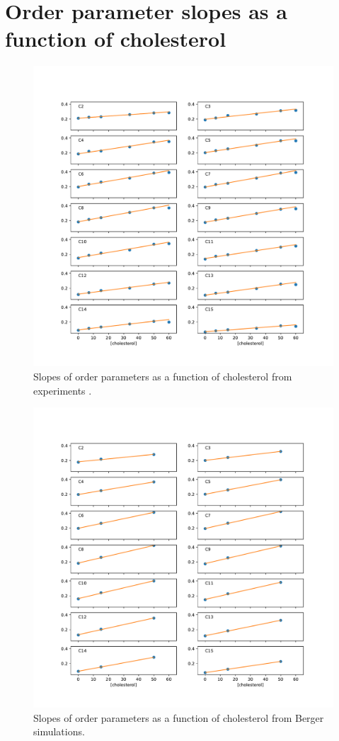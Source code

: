 \documentclass[journal=jpcbfk]{achemso}
\begin{document}
\section{Order parameter slopes as a function of cholesterol}
 \begin{figure}[]
  \centering
  \includegraphics[width=19cm]{../FIGS/slopesEXPERIMENT.pdf}
  \caption{\label{slopes}
    Slopes of order parameters as a function of cholesterol from experiments \cite{ferreira13}.
  }
\end{figure}

 \begin{figure}[]
  \centering
  \includegraphics[width=19cm]{../FIGS/slopesBERGER.pdf}
  \caption{\label{slopesberger}
    Slopes of order parameters as a function of cholesterol from Berger simulations.
  }
\end{figure}
\end{document}
